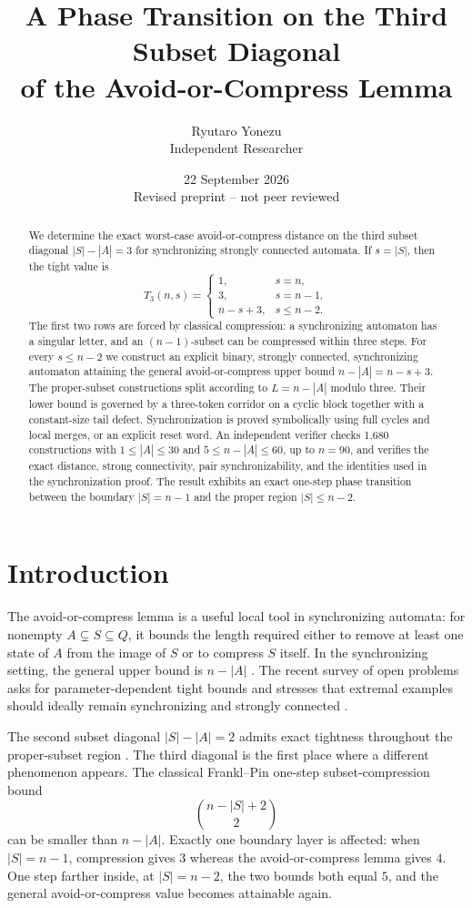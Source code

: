 \documentclass[11pt]{article}
\title{A Phase Transition on the Third Subset Diagonal\\of the Avoid-or-Compress Lemma}
\author{Ryutaro Yonezu\\Independent Researcher}
\date{22 September 2026\\Revised preprint -- not peer reviewed}
\theoremstyle{definition}
\theoremstyle{remark}
\begin{document}
\maketitle

\begin{abstract}
We determine the exact worst-case avoid-or-compress distance on the third subset diagonal $|S|-|A|=3$ for synchronizing strongly connected automata. If $s=|S|$, then the tight value is
\[
T_3(n,s)=
\begin{cases}
1,&s=n,\\
3,&s=n-1,\\
n-s+3,&s\le n-2.
\end{cases}
\]
The first two rows are forced by classical compression: a synchronizing automaton has a singular letter, and an $(n-1)$-subset can be compressed within three steps. For every $s\le n-2$ we construct an explicit binary, strongly connected, synchronizing automaton attaining the general avoid-or-compress upper bound $n-|A|=n-s+3$. The proper-subset constructions split according to $L=n-|A|$ modulo three. Their lower bound is governed by a three-token corridor on a cyclic block together with a constant-size tail defect. Synchronization is proved symbolically using full cycles and local merges, or an explicit reset word. An independent verifier checks 1,680 constructions with $1\le |A|\le30$ and $5\le n-|A|\le60$, up to $n=90$, and verifies the exact distance, strong connectivity, pair synchronizability, and the identities used in the synchronization proof. The result exhibits an exact one-step phase transition between the boundary $|S|=n-1$ and the proper region $|S|\le n-2$.
\end{abstract}

\section{Introduction}
The avoid-or-compress lemma is a useful local tool in synchronizing automata: for nonempty $A\subsetneq S\subseteq Q$, it bounds the length required either to remove at least one state of $A$ from the image of $S$ or to compress $S$ itself. In the synchronizing setting, the general upper bound is $n-|A|$ \cite{Szykula2018,Szykula2026}. The recent survey of open problems asks for parameter-dependent tight bounds and stresses that extremal examples should ideally remain synchronizing and strongly connected \cite{Szykula2026}.

The second subset diagonal $|S|-|A|=2$ admits exact tightness throughout the proper-subset region \cite{Yonezu2026Second}. The third diagonal is the first place where a different phenomenon appears. The classical Frankl--Pin one-step subset-compression bound
\[
\binom{n-|S|+2}{2}
\]
can be smaller than $n-|A|$. Exactly one boundary layer is affected: when $|S|=n-1$, compression gives $3$ whereas the avoid-or-compress lemma gives $4$. One step farther inside, at $|S|=n-2$, the two bounds both equal $5$, and the general avoid-or-compress value becomes attainable again.
\end{document}
